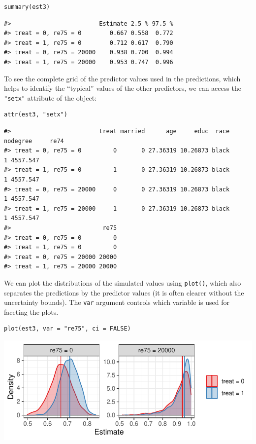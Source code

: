 \begin{verbatim}
summary(est3)
\end{verbatim}

\begin{verbatim}
#>                         Estimate 2.5 % 97.5 %
#> treat = 0, re75 = 0        0.667 0.558  0.772
#> treat = 1, re75 = 0        0.712 0.617  0.790
#> treat = 0, re75 = 20000    0.938 0.700  0.994
#> treat = 1, re75 = 20000    0.953 0.747  0.996
\end{verbatim}

To see the complete grid of the predictor values used in the predictions, which helps to identify the ``typical'' values of the other predictors, we can access the \texttt{"setx"} attribute of the object:

\begin{verbatim}
attr(est3, "setx")
\end{verbatim}

\begin{verbatim}
#>                         treat married      age     educ  race nodegree     re74
#> treat = 0, re75 = 0         0       0 27.36319 10.26873 black        1 4557.547
#> treat = 1, re75 = 0         1       0 27.36319 10.26873 black        1 4557.547
#> treat = 0, re75 = 20000     0       0 27.36319 10.26873 black        1 4557.547
#> treat = 1, re75 = 20000     1       0 27.36319 10.26873 black        1 4557.547
#>                          re75
#> treat = 0, re75 = 0         0
#> treat = 1, re75 = 0         0
#> treat = 0, re75 = 20000 20000
#> treat = 1, re75 = 20000 20000
\end{verbatim}

We can plot the distributions of the simulated values using \texttt{plot()}, which also separates the predictions by the predictor values (it is often clearer without the uncertainty bounds). The \texttt{var} argument controls which variable is used for faceting the plots.

\begin{verbatim}
plot(est3, var = "re75", ci = FALSE)
\end{verbatim}

\begin{center}\includegraphics{figures/plot3-1} \end{center}

